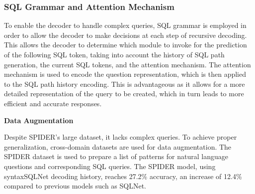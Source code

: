 \subsubsection*{SQL Grammar and Attention Mechanism}

To enable the decoder to handle complex queries, SQL grammar is employed in order to allow the decoder to make decisions at each step of recursive decoding. This allows the decoder to determine which module to invoke for the prediction of the following SQL token, taking into account the history of SQL path generation, the current SQL tokens, and the attention mechanism. The attention mechanism is used to encode the question representation, which is then applied to the SQL path history encoding. This is advantageous as it allows for a more detailed representation of the query to be created, which in turn leads to more efficient and accurate responses.

\textbf{Data Augmentation}

Despite SPIDER's large dataset, it lacks complex queries. To achieve proper generalization, cross-domain datasets are used for data augmentation. The SPIDER dataset is used to prepare a list of patterns for natural language questions and corresponding SQL queries. The SPIDER model, using syntaxSQLNet decoding history, reaches 27.2\% accuracy, an increase of 12.4\% compared to previous models such as SQLNet.